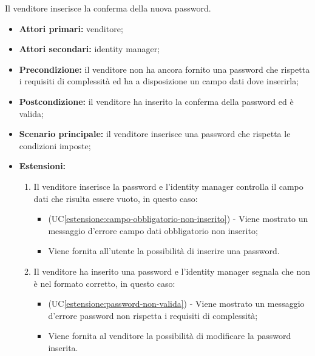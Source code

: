 Il venditore inserisce la conferma della nuova password.
\begin{itemize}
	\item \textbf{Attori primari:} venditore;
	\item \textbf{Attori secondari:} identity manager;
	\item \textbf{Precondizione:} il venditore non ha ancora fornito una password che rispetta i requisiti di complessità ed ha a disposizione un campo dati dove inserirla;
	\item \textbf{Postcondizione:} il venditore ha inserito la conferma della password ed è valida;
	\item \textbf{Scenario principale:} il venditore inserisce una password che rispetta le condizioni imposte;
	\item \textbf{Estensioni:}
	\begin{enumerate}[label=\lett]
		\item Il venditore inserisce la password e l'identity manager controlla il campo dati che risulta essere vuoto, in questo caso:
		\begin{itemize}
			\item (UC\ref{estensione:campo-obbligatorio-non-inserito}) - Viene mostrato un messaggio d'errore campo dati obbligatorio non inserito;
			\item Viene fornita all'utente la possibilità di inserire una password.
		\end{itemize}
		\item Il venditore ha inserito una password e l'identity manager segnala che non è nel formato corretto, in questo caso:
		\begin{itemize}
			\item (UC\ref{estensione:password-non-valida}) - Viene mostrato un messaggio d'errore password non rispetta i requisiti di complessità;
			\item Viene fornita al venditore la possibilità di modificare la password inserita.
		\end{itemize}
	\end{enumerate} 
\end{itemize}

\label{modifica-informazioni-venditore.logo}

